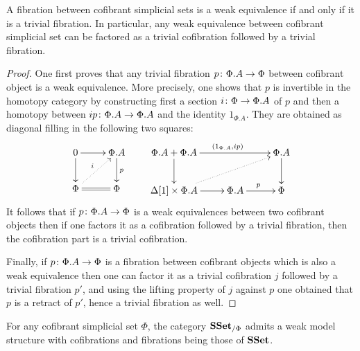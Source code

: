 \documentclass[reqno,10pt,a4paper,oneside,draft]{amsart}
\begin{document}
\begin{lemma}\label{lemma:triv_fib_are_we}
A fibration between cofibrant simplicial sets is a weak equivalence if and only if it is a trivial fibration.
In particular, any weak equivalence between cofibrant simplicial set can be factored as a trivial cofibration followed by a trivial fibration.
\end{lemma}

\begin{proof}
One first proves that any trivial fibration  $p \colon \Phi.A \to \Phi$ between cofibrant object is a weak equivalence. More precisely, one shows that $p$ is invertible in the homotopy category by constructing first a section $i \colon \Phi \rightarrow \Phi.A$ of $p$ and then a homotopy between $i  p \colon \Phi.A \to \Phi.A$ and the identity $1_{\Phi.A}$. They are obtained as diagonal filling in the following two squares:
\[
\xymatrix{0 \ar[r] \ar[d] & \Phi.A \ar[d]^{p} \\ 
\Phi \ar@{.>}[ur]^{i} \ar@{=}[r] & \Phi}
\qquad
\xymatrix{\Phi.A + \Phi.A \ar[rr]^{(1_{\Phi.A} , i  p)} \ar[d] & &  \Phi.A \ar[d] \\ \Delta[1] \times \Phi.A \ar@{.>}[rru] \ar[r]& \Phi.A \ar[r]^{p} & \Phi  }
\]
It follows that if $p \colon \Phi.A \rightarrow \Phi$ is a weak equivalences between two cofibrant objects then if one factors it as a cofibration followed by a trivial fibration, then the cofibration part is a trivial cofibration. 

Finally, if $p \colon \Phi.A \to \Phi$ is a fibration between cofibrant objects which is also a weak equivalence then one can factor it as a trivial cofibration $j$ followed by a trivial fibration $p'$, and using the lifting property of $j$ against $p$ one obtained that $p$ is a retract of $p'$, hence a trivial fibration as well.
\end{proof}



\begin{corollary}
For any cofibrant simplicial set $\Phi$, the category $\mathbf{SSet}_{/\Phi}$ admits a weak model structure with cofibrations and fibrations  being those of $\mathbf{SSet}$.
\end{corollary}
\end{document}
